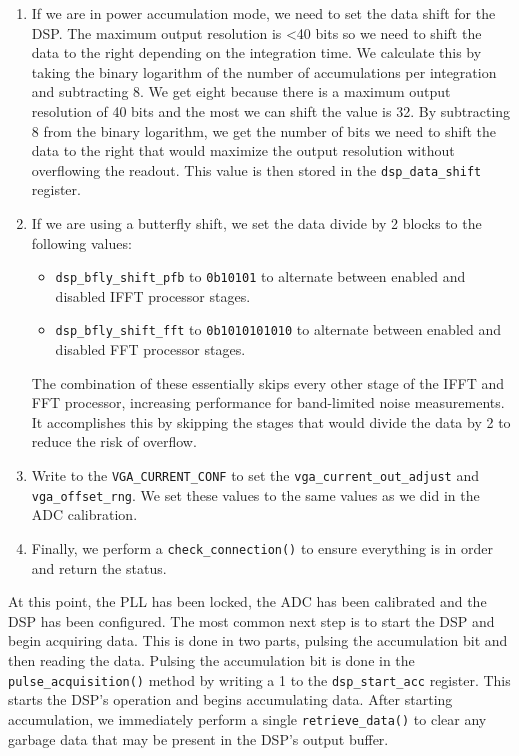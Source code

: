 \begin{enumerate}
    \item 
        If we are in power accumulation mode, we need to set the data shift for the DSP. 
        The maximum output resolution is <40 bits so we need to shift the data to the right depending on the integration time.
        We calculate this by taking the binary logarithm of the number of accumulations per integration and subtracting 8.
        We get eight because there is a maximum output resolution of 40 bits and the most we can shift the value is 32.
        By subtracting 8 from the binary logarithm, we get the number of bits we need to shift the data to the right that would maximize the output resolution without overflowing the readout.
        This value is then stored in the \texttt{dsp\_data\_shift} register.
    \item 
        If we are using a butterfly shift, we set the data divide by 2 blocks to the following values:
        \begin{itemize}
            \item \texttt{dsp\_bfly\_shift\_pfb} to \texttt{0b10101} to alternate between enabled and disabled IFFT processor stages. 
            \item \texttt{dsp\_bfly\_shift\_fft} to \texttt{0b1010101010} to alternate between enabled and disabled FFT processor stages.
        \end{itemize}
        The combination of these essentially skips every other stage of the IFFT and FFT processor, increasing performance for band-limited noise measurements.
        It accomplishes this by skipping the stages that would divide the data by 2 to reduce the risk of overflow. 
    \item 
        Write to the \texttt{VGA\_CURRENT\_CONF} to set the \texttt{vga\_current\_out\_adjust} and \texttt{vga\_offset\_rng}.
        We set these values to the same values as we did in the ADC calibration.
    \item 
        Finally, we perform a \texttt{check\_connection()} to ensure everything is in order and return the status.
\end{enumerate}

At this point, the PLL has been locked, the ADC has been calibrated and the DSP has been configured. 
The most common next step is to start the DSP and begin acquiring data. 
This is done in two parts, pulsing the accumulation bit and then reading the data. 
Pulsing the accumulation bit is done in the \texttt{pulse\_acquisition()} method by writing a 1 to the \texttt{dsp\_start\_acc} register.
This starts the DSP's operation and begins accumulating data.
After starting accumulation, we immediately perform a single \texttt{retrieve\_data()} to clear any garbage data that may be present in the DSP's output buffer.

